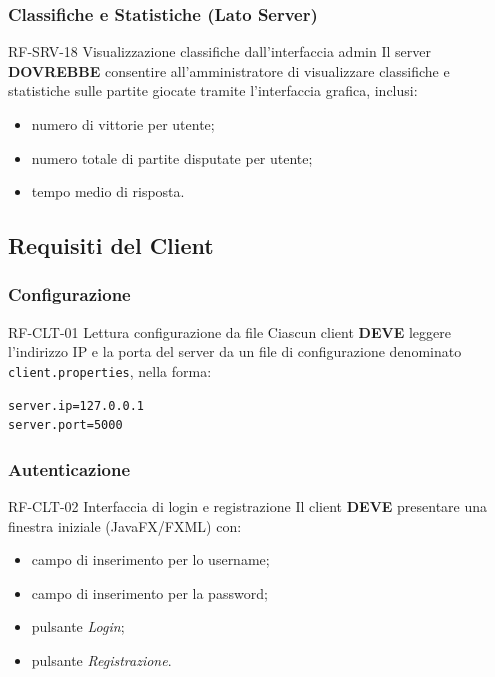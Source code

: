 \documentclass[12pt, a4paper]{article}
\newcommand{\mustshall}{\textbf{DEVE}}
\newcommand{\should}{\textbf{DOVREBBE}}
\newcommand{\code}[1]{\texttt{#1}}
\begin{document}
\subsubsection{Classifiche e Statistiche (Lato Server)}

\begin{reqbox}{RF-SRV-18 \quad Visualizzazione classifiche dall'interfaccia admin \quad [SHOULD]}
Il server \should{} consentire all'amministratore di visualizzare classifiche e statistiche sulle partite giocate tramite l'interfaccia grafica, inclusi:
\begin{itemize}
    \item numero di vittorie per utente;
    \item numero totale di partite disputate per utente;
    \item tempo medio di risposta.
\end{itemize}
\end{reqbox}

\subsection{Requisiti del Client}

\subsubsection{Configurazione}

\begin{reqbox}{RF-CLT-01 \quad Lettura configurazione da file \quad [MUST]}
Ciascun client \mustshall{} leggere l'indirizzo IP e la porta del server da un file di configurazione denominato \code{client.properties}, nella forma:
\begin{lstlisting}[language={}]
server.ip=127.0.0.1
server.port=5000
\end{lstlisting}
\end{reqbox}

\subsubsection{Autenticazione}

\begin{reqbox}{RF-CLT-02 \quad Interfaccia di login e registrazione \quad [MUST]}
Il client \mustshall{} presentare una finestra iniziale (JavaFX/FXML) con:
\begin{itemize}
    \item campo di inserimento per lo username;
    \item campo di inserimento per la password;
    \item pulsante \textit{Login};
    \item pulsante \textit{Registrazione}.
\end{itemize}
\end{reqbox}
\end{document}
